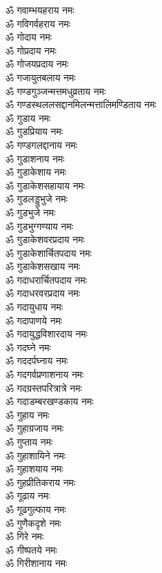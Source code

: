 \begin{multicols}{2}
\begin{flushleft}
ॐ गवाम्भयहराय नमः\\
ॐ गविगर्वहराय नमः\\
ॐ गोदाय नमः\\
ॐ गोप्रदाय नमः\\
ॐ गोजयप्रदाय नमः\\
ॐ गजायुतबलाय नमः\\
ॐ गण्डगुञ्जन्मत्तमधुव्रताय नमः\\
ॐ गण्डस्थललसद्दानमिलन्मत्तालिमण्डिताय नमः\\
ॐ गुडाय नमः\\
ॐ गुडप्रियाय नमः\hfill{}\\
ॐ गण्डगलद्दानाय नमः\\
ॐ गुडाशनाय नमः\\
ॐ गुडाकेशाय नमः\\
ॐ गुडाकेशसहायाय नमः\\
ॐ गुडलड्डुभुजे नमः\\
ॐ गुडभुजे नमः\\
ॐ गुडभुग्गण्याय नमः\\
ॐ गुडाकेशवरप्रदाय नमः\\
ॐ गुडाकेशार्चितपदाय नमः\\
ॐ गुडाकेशसखाय नमः\hfill{}\\
ॐ गदाधरार्चितपदाय नमः\\
ॐ गदाधरवरप्रदाय नमः\\
ॐ गदायुधाय नमः\\
ॐ गदापाणये नमः\\
ॐ गदायुद्धविशारदाय नमः\\
ॐ गदघ्ने नमः\\
ॐ गददर्पघ्नाय नमः\\
ॐ गदगर्वप्रणाशनाय नमः\\
ॐ गदग्रस्तपरित्रात्रे नमः\\
ॐ गदाडम्बरखण्डकाय नमः\hfill{}\\
ॐ गुहाय नमः\\
ॐ गुहाग्रजाय नमः\\
ॐ गुप्ताय नमः\\
ॐ गुहाशायिने नमः\\
ॐ गुहाशयाय नमः\\
ॐ गुहप्रीतिकराय नमः\\
ॐ गूढाय नमः\\
ॐ गूढगुल्फाय नमः\\
ॐ गुणैकदृशे नमः\\
ॐ गिरे नमः\hfill{}\\
ॐ गीष्पतये नमः\\
ॐ गिरीशानाय नमः\\

\end{flushleft}
\end{multicols}

